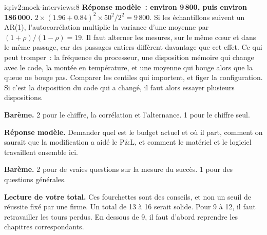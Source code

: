 \begin{solution}{iq:iv2:mock-interviews:8}
\ivstop
\textbf{Réponse modèle~: environ 9\,800, puis environ 186\,000.} $2 \times (1.96 + 0.84)^2 \times 50^2/2^2 = 9\,800$. Si les échantillons suivent un AR(1), l'autocorrélation multiplie la variance d'une moyenne par $(1 + \rho)/(1 - \rho) = 19$. Il faut alterner les mesures, sur le même cœur et dans le même passage, car des passages entiers diffèrent davantage que cet effet. Ce qui peut tromper~: la fréquence du processeur, une disposition mémoire qui change avec le code, la montée en température, et une moyenne qui bouge alors que la queue ne bouge pas. Comparer les centiles qui importent, et figer la configuration. Si c'est la disposition du code qui a changé, il faut alors essayer plusieurs dispositions.

\textbf{Barème.} 2 pour le chiffre, la corrélation et l'alternance. 1 pour le chiffre seul.

\ivstop
\textbf{Réponse modèle.} Demander quel est le budget actuel et où il part, comment on saurait que la modification a aidé le P\&L, et comment le matériel et le logiciel travaillent ensemble ici.

\textbf{Barème.} 2 pour de vraies questions sur la mesure du succès. 1 pour des questions générales.

\medskip
\textbf{Lecture de votre total.} Ces fourchettes sont des conseils, et non un seuil de réussite fixé par une firme. Un total de 13 à 16 serait solide. Pour 9 à 12, il faut retravailler les tours perdus. En dessous de 9, il faut d'abord reprendre les chapitres correspondants.

\end{solution}

